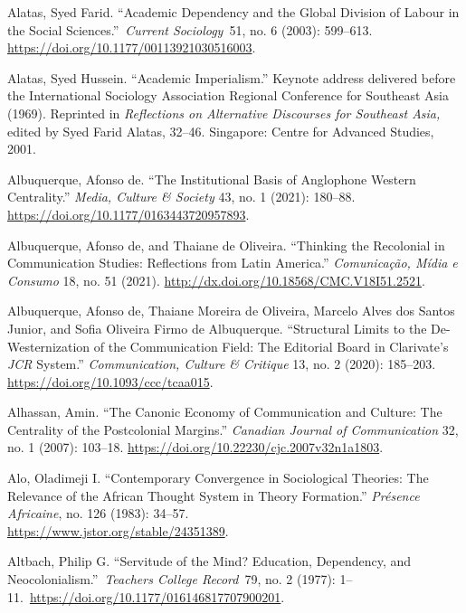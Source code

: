 \documentclass{tufte-handout}
\begin{document}
\begin{hangparas}{.25in}{1} 



Alatas, Syed Farid. ``Academic Dependency and the Global Division of
Labour in the Social Sciences.''~\emph{Current Sociology}~51, no. 6
(2003): 599--613. \url{https://doi.org/10.1177/00113921030516003}.

Alatas, Syed Hussein. ``Academic Imperialism.'' Keynote address
delivered before the International Sociology Association Regional
Conference for Southeast Asia (1969). Reprinted in \emph{Reflections on
Alternative Discourses for Southeast Asia,} edited by Syed Farid Alatas,
32--46. Singapore: Centre for Advanced Studies, 2001.

Albuquerque, Afonso de. ``The Institutional Basis of Anglophone Western
Centrality.'' \emph{Media, Culture \& Society} 43, no. 1 (2021):
180--88. \url{https://doi.org/10.1177/0163443720957893}.

Albuquerque, Afonso de, and Thaiane de Oliveira. ``Thinking the
Recolonial in Communication Studies: Reflections from Latin America.''
\emph{Comunicação, Mídia e Consumo} 18, no. 51 (2021).
\url{http://dx.doi.org/10.18568/CMC.V18I51.2521}.

Albuquerque, Afonso de, Thaiane Moreira de Oliveira, Marcelo Alves dos
Santos Junior, and Sofia Oliveira Firmo de Albuquerque. ``Structural
Limits to the De-Westernization of the Communication Field: The
Editorial Board in Clarivate's \emph{JCR} System.'' \emph{Communication,
Culture \& Critique} 13, no. 2 (2020): 185--203.
\url{https://doi.org/10.1093/ccc/tcaa015}.

Alhassan, Amin. ``The Canonic Economy of Communication and Culture: The
Centrality of the Postcolonial Margins.'' \emph{Canadian Journal of
Communication} 32, no. 1 (2007): 103--18.
\url{https://doi.org/10.22230/cjc.2007v32n1a1803}.

Alo, Oladimeji I. ``Contemporary Convergence in Sociological Theories:
The Relevance of the African Thought System in Theory Formation.''
\emph{Présence Africaine}, no. 126 (1983): 34--57.\\\hspace{0.21in}
\href{http://www.jstor.org/stable/3539695}{https://www.jstor.org/stable/24351389}.

Altbach, Philip G. ``Servitude of the Mind? Education, Dependency, and
Neocolonialism.''~\emph{Teachers College Record}~79, no. 2 (1977):
1--11.~\url{https://doi.org/10.1177/016146817707900201}.


\end{hangparas}
\end{document}
